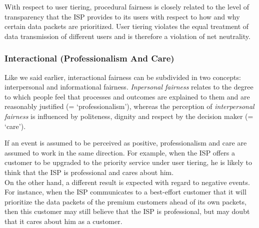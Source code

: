 With respect to user tiering, procedural fairness is closely related to the level of transparency that the \ac{ISP} provides to its users with respect to how and why certain data packets are prioritized. User tiering violates the equal treatment of data transmission of different users and is therefore a violation of net neutrality.

\subsubsection{Interactional (Professionalism And Care)}
Like we said earlier, interactional fairness can be subdivided in two concepts: interpersonal and informational fairness. \emph{Inpersonal fairness} relates to the degree to which people feel that processes and outcomes are explained to them and are reasonably justified (= `professionalism'), whereas the perception of \emph{interpersonal fairness} is influenced by politeness, dignity and respect by the decision maker (= `care').

If an event is assumed to be perceived as positive, professionalism and care are assumed to work in the same direction. For example, when the \ac{ISP} offers a customer to be upgraded to the priority service under user tiering, he is likely to think that the \ac{ISP} is professional and cares about him.\\
On the other hand, a different result is expected with regard to negative events. For instance, when the \ac{ISP} communicates to a best-effort customer that it will prioritize the data packets of the premium customers ahead of its own packets, then this customer may still believe that the \ac{ISP} is professional, but may doubt that it cares about him as a customer.